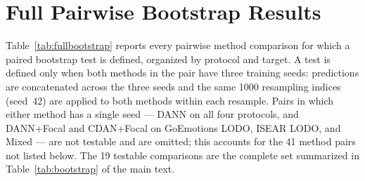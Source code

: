 \section{Full Pairwise Bootstrap Results}
\label{app:bootstrap}

Table~\ref{tab:fullbootstrap} reports every pairwise method comparison
for which a paired bootstrap test is defined, organized by protocol
and target. A test is defined only when both methods in the pair have
three training seeds: predictions are concatenated across the three
seeds and the same 1000 resampling indices (seed~42) are applied to
both methods within each resample. Pairs in which either method has a
single seed --- DANN on all four protocols, and DANN+Focal and
CDAN+Focal on GoEmotions LODO, ISEAR LODO, and Mixed --- are not
testable and are omitted; this accounts for the 41 method pairs not
listed below. The 19 testable comparisons are the complete set
summarized in Table~\ref{tab:bootstrap} of the main text.

